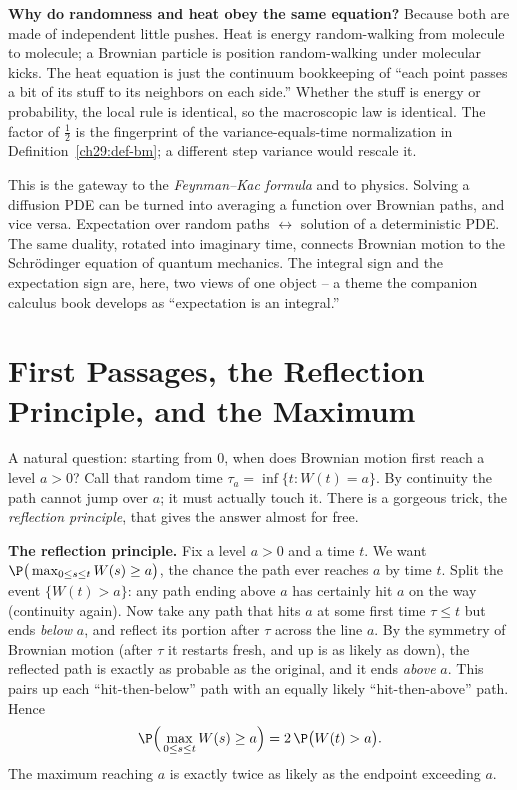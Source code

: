 \begin{happeningbox}
\textbf{Why do randomness and heat obey the same equation?} Because both are made
of independent little pushes. Heat is energy random-walking from molecule to
molecule; a Brownian particle is position random-walking under molecular kicks.
The heat equation is just the continuum bookkeeping of ``each point passes a bit
of its stuff to its neighbors on each side.'' Whether the stuff is energy or
probability, the local rule is identical, so the macroscopic law is identical. The
factor of $\tfrac12$ is the fingerprint of the variance-equals-time normalization
in Definition~\ref{ch29:def-bm}; a different step variance would rescale it.
\end{happeningbox}

\begin{connectionbox}
This is the gateway to the \emph{Feynman--Kac formula} and to physics. Solving a
diffusion PDE can be turned into averaging a function over Brownian paths, and
vice versa. Expectation over random paths $\leftrightarrow$ solution of a
deterministic PDE. The same duality, rotated into imaginary time, connects
Brownian motion to the Schr\"odinger equation of quantum mechanics. The integral
sign and the expectation sign are, here, two views of one object -- a theme the
companion calculus book develops as ``expectation is an integral.''
\end{connectionbox}

\section{First Passages, the Reflection Principle, and the Maximum}
\label{ch29:reflection}

A natural question: starting from $0$, when does Brownian motion first reach a
level $a>0$? Call that random time $\tau_a = \inf\{t: W(t)=a\}$. By continuity the
path cannot jump over $a$; it must actually touch it. There is a gorgeous trick,
the \emph{reflection principle}, that gives the answer almost for free.

\begin{whybox}
\textbf{The reflection principle.} Fix a level $a>0$ and a time $t$. We want
$\P\big(\max_{0\le s\le t} W(s) \ge a\big)$, the chance the path ever reaches $a$
by time $t$. Split the event $\{W(t)>a\}$: any path ending above $a$ has certainly
hit $a$ on the way (continuity again). Now take any path that hits $a$ at some
first time $\tau\le t$ but ends \emph{below} $a$, and reflect its portion after
$\tau$ across the line $a$. By the symmetry of Brownian motion (after $\tau$ it
restarts fresh, and up is as likely as down), the reflected path is exactly as
probable as the original, and it ends \emph{above} $a$. This pairs up each
``hit-then-below'' path with an equally likely ``hit-then-above'' path. Hence
\[
  \P\Big(\max_{0\le s\le t} W(s)\ge a\Big) = 2\,\P\big(W(t)>a\big).
\]
The maximum reaching $a$ is exactly twice as likely as the endpoint exceeding $a$.
\end{whybox}

